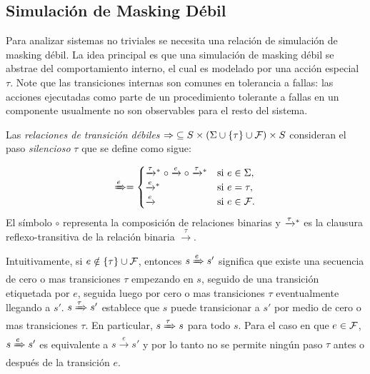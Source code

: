 \subsection{Simulación de Masking Débil}

Para analizar sistemas no triviales se necesita una relación de simulación de masking débil. La idea principal es que una simulación de masking débil se abstrae del comportamiento interno, el cual es modelado por una acción especial $\tau$. Note que las transiciones internas son comunes en tolerancia a fallas: las acciones ejecutadas como parte de un procedimiento tolerante a fallas en un componente usualmente no son observables para el resto del sistema.

Las \textit{relaciones de transición débiles} ${\Rightarrow} \subseteq S
\times (\Sigma \cup \{\tau\} \cup \mathcal{F}) \times S$ consideran el paso \emph{silencioso} $\tau$ que se define como sigue: 

\[
\xRightarrow{e} = 
       \begin{cases}
            \mathrel{{\xrightarrow[]{\tau}}{}^*} \circ \xrightarrow{e} \circ \mathrel{{\xrightarrow[]{\tau}}{}^*} & 
            \text{si } e \in \Sigma,  \\ 
            \mathrel{{\xrightarrow[]{e}}{}^*} & \text{si } e = \tau,  \\
            \xrightarrow{e} & \text{si } e \in \mathcal{F}.\\
       \end{cases}
\]
%
El símbolo $\circ$ representa la composición de relaciones binarias y $\mathrel{{\xrightarrow[]{\tau}}{}^*}$ es la clausura reflexo-transitiva de la relación binaria $\xrightarrow{\tau}$. 

Intuitivamente, si $e \notin \{\tau\}\cup\mathcal{F}$, entonces $s\xRightarrow{e}s'$ significa que existe una secuencia de cero o mas transiciones $\tau$ empezando en $s$, seguido de una transición etiquetada por $e$, seguida luego por cero o mas transiciones $\tau$ eventualmente llegando a  $s'$.
$s \xRightarrow{\tau} s'$ establece que $s$ puede transicionar a $s'$ por medio de cero o mas transiciones $\tau$.
%
En particular, $s \xRightarrow{\tau} s$ para todo $s$.
%
Para el caso en que $e\in\mathcal{F}$,
$s\xRightarrow{e}s'$ es equivalente a $s\xrightarrow{e}s'$ y por lo tanto
no se permite ningún paso $\tau$ antes o después de la transición $e$.


